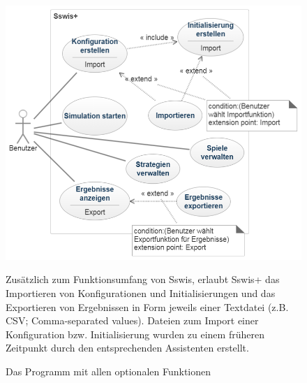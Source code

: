 \begin{figure}[htbp]
{\centering
\includegraphics[width=1.0\textwidth]{Anwendungsfalldiagramme/usecase_sswis+.png}
\caption{Das Programm mit allen optionalen Funktionen} }
\bigskip

Zusätzlich zum Funktionsumfang von Sswis, erlaubt Sswis+ das Importieren von Konfigurationen und Initialisierungen und das Exportieren von Ergebnissen in Form jeweils einer Textdatei (z.B. CSV; Comma-separated values). Dateien zum Import einer Konfiguration bzw. Initialisierung wurden zu einem früheren Zeitpunkt durch den entsprechenden Assistenten erstellt.

\end{figure}